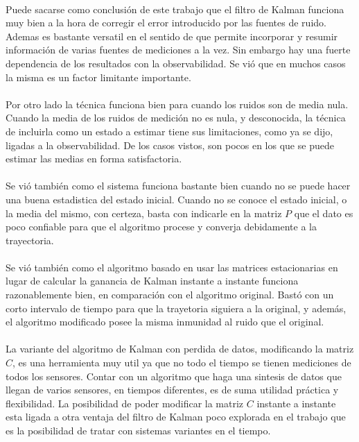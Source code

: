 
	\paragraph{}
	Puede sacarse como conclusión de este trabajo que el filtro de Kalman funciona muy bien a la hora de corregir el error introducido por las fuentes de ruido. Ademas es bastante versatil en el sentido de que permite incorporar y resumir información de varias fuentes de mediciones a la vez. Sin embargo hay una fuerte dependencia de los resultados con la observabilidad. Se vió que en muchos casos la misma es un factor limitante importante.
	
	\paragraph{}
	Por otro lado la técnica funciona bien para cuando los ruidos son de media nula. Cuando la media de los ruidos de medición no es nula, y desconocida, la técnica de incluirla como un estado a estimar tiene sus limitaciones, como ya se dijo, ligadas a la observabilidad. De los casos vistos, son pocos en los que se puede estimar las medias en forma satisfactoria.
	
	\paragraph{}
	Se vió también como el sistema funciona bastante bien cuando no se puede hacer una buena estadistica del estado inicial. Cuando no se conoce el estado inicial, o la media del mismo, con certeza, basta con indicarle en la matriz $P$ que el dato es poco confiable para que el algoritmo procese y converja debidamente a la trayectoria.
	
	\paragraph{}
	Se vió también como el algoritmo basado en usar las matrices estacionarias en lugar de calcular la ganancia de Kalman instante a instante funciona razonablemente bien, en comparación con el algoritmo original. Bastó con un corto intervalo de tiempo para que la trayetoria siguiera a la original, y además, el algoritmo modificado posee la misma inmunidad al ruido que el original.
	
	\paragraph{}
	La variante del algoritmo de Kalman con perdida de datos, modificando la matriz $C$, es una herramienta muy util ya que no todo el tiempo se tienen mediciones de todos los sensores. Contar con un algoritmo que haga una sintesis de datos que llegan de varios sensores, en tiempos diferentes, es de suma utilidad práctica y flexibilidad. La posibilidad de poder modificar la matriz $C$ instante a instante esta ligada a otra ventaja del filtro de Kalman poco explorada en el trabajo que es la posibilidad de tratar con sistemas variantes en el tiempo.
	
